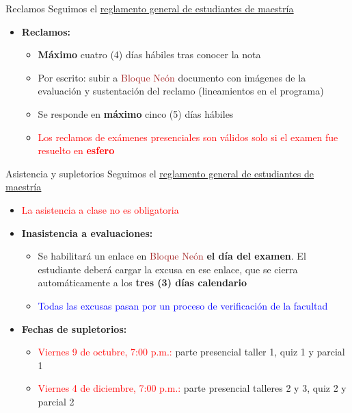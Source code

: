 \documentclass[10pt, xcolor=dvipsnames]{beamer}
\begin{document}
\begin{frame}{Reclamos}
Seguimos el \href{https://secretariageneral.uniandes.edu.co/index.php/es/component/content/article/11-asuntos-estudiantiles/24-reglamentos-estudiantiles}{\underline{reglamento general de estudiantes de maestría}}
\begin{itemize}[itemsep=0.1em, parsep=0pt]
    \item \textbf{Reclamos:}
    \begin{itemize}[itemsep=0.1em, parsep=0pt]
        \item \textbf{Máximo} cuatro (4) días hábiles tras conocer la nota
        \item Por escrito: subir a \textcolor{brown}{Bloque Neón} documento con imágenes de la evaluación y sustentación del reclamo (lineamientos en el programa)
        \item Se responde en \textbf{máximo} cinco (5) días hábiles
        \item \textcolor{red}{Los reclamos de exámenes presenciales son válidos solo si el examen fue resuelto en \textbf{esfero}}
    \end{itemize}	 	 
\end{itemize}
\end{frame}


\begin{frame}{Asistencia y supletorios}
Seguimos el \href{https://secretariageneral.uniandes.edu.co/index.php/es/component/content/article/11-asuntos-estudiantiles/24-reglamentos-estudiantiles}{\underline{reglamento general de estudiantes de maestría}}
\begin{itemize}[itemsep=0.1em, parsep=0pt]
    \item \textcolor{red}{La asistencia a clase no es obligatoria}
    \item \textbf{Inasistencia a evaluaciones:} 
    \begin{itemize}[itemsep=0.1em, parsep=0pt]
        \item Se habilitará un enlace en \textcolor{brown}{Bloque Neón} \textbf{el día del examen}. El estudiante deberá cargar la excusa en ese enlace, que se cierra automáticamente a los \textbf{tres (3) días calendario}
        \item \textcolor{blue}{Todas las excusas pasan por un proceso de verificación de la facultad}
    \end{itemize}
    \item \textbf{Fechas de supletorios:}
    \begin{itemize}[itemsep=0.1em, parsep=0pt]
        \item \textcolor{red}{Viernes 9 de octubre, 7:00 p.m.:} parte presencial taller 1, quiz 1 y parcial 1
        \item \textcolor{red}{Viernes 4 de diciembre, 7:00 p.m.:} parte presencial talleres 2 y 3, quiz 2 y parcial 2
    \end{itemize}
\end{itemize}
\end{frame}
\end{document}
